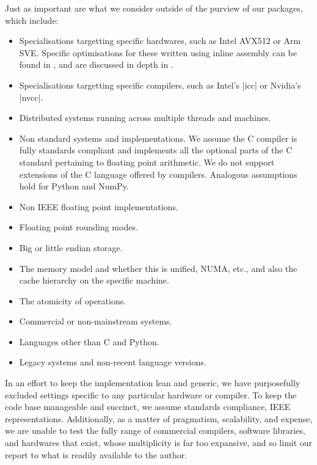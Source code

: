 Just as important are what we consider outside of the purview of our packages, which include:
\begin{itemize}
\item Specialisations targetting specific hardwares, such as Intel AVX512 or Arm SVE. Specific optimisations for these written using inline assembly can be found in \citep{todo}, and are discussed in depth in \citep[\S\,4.3.3]{sheridan2020nested}. 

\item Specialisations targetting specific compilers, such as Intel's \inlineplain|icc| or Nvidia's \inlineplain|nvcc|. 

\item Distributed systems running across multiple threads and machines. 

\item Non standard systems and implementations. We assume the C compiler is fully standards compliant and implements all the optional parts of the C standard pertaining to floating point arithmetic. We do not support extensions of the C language offered by compilers. Analogous assumptions hold for Python and NumPy.

\item Non IEEE floating point implementations.

\item Floating point rounding modes.

\item Big or little endian storage. 

\item The memory model and whether this is unified, NUMA, etc., and also the cache hierarchy on the specific machine. 

\item The atomicity of operations. 

\item Commercial or non-mainstream systems.

\item Languages other than C and Python.

\item Legacy systems and non-recent language versions.
\end{itemize}
In an effort to keep the implementation lean and generic, we have purposefully excluded settings specific to any particular hardware or compiler. To keep the code base manageable and succinct, we assume standards compliance, IEEE representations. Additionally, as a matter of pragmatism, scalability, and expense, we are unable to test the fully range of commercial compilers, software libraries, and hardwares that exist, whose multiplicity is far too expansive, and so limit our report to what is readily available to the author.
